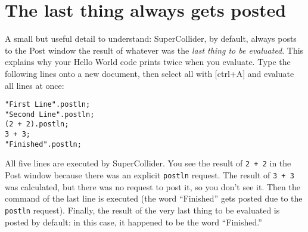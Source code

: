 \section{The last thing always gets posted}

A small but useful detail to understand: SuperCollider, by default, always posts to the Post window the result of whatever was the \emph{last thing to be evaluated}. This explains why your Hello World code prints twice when you evaluate. Type the following lines onto a new document, then select all with [ctrl+A] and evaluate all lines at once:

\begin{lstlisting}[style=SuperCollider-IDE, basicstyle=\scttfamily\footnotesize]
"First Line".postln;
"Second Line".postln;
(2 + 2).postln;
3 + 3;
"Finished".postln;
\end{lstlisting}

All five lines are executed by SuperCollider. You see the result of \texttt{2 + 2} in the Post window because there was an explicit \texttt{postln} request. The result of \texttt{3 + 3} was calculated, but there was no request to post it, so you don't see it. Then the command of the last line is executed (the word ``Finished'' gets posted due to the \texttt{postln} request). Finally, the result of the very last thing to be evaluated is posted by default: in this case, it happened to be the word ``Finished.''